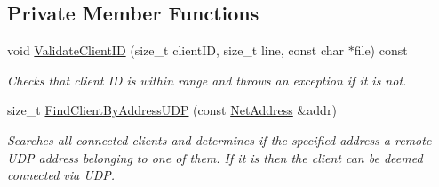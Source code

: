\subsection*{Private Member Functions}
\begin{DoxyCompactItemize}
\item 
void \hyperlink{class_net_instance_server_a5d897df5cbe7e4aa3f2c0b963479f38d}{ValidateClientID} (size\_\-t clientID, size\_\-t line, const char $\ast$file) const 
\begin{DoxyCompactList}\small\item\em Checks that client ID is within range and throws an exception if it is not. \item\end{DoxyCompactList}\item 
size\_\-t \hyperlink{class_net_instance_server_ab2c52af8d0d42b385ebb17f02a8e8645}{FindClientByAddressUDP} (const \hyperlink{class_net_address}{NetAddress} \&addr)
\begin{DoxyCompactList}\small\item\em Searches all connected clients and determines if the specified address a remote UDP address belonging to one of them. If it is then the client can be deemed connected via UDP. \item\end{DoxyCompactList}\end{DoxyCompactItemize}
